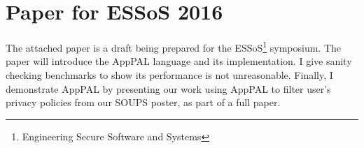 \documentclass[a4paper]{scrartcl}
\begin{document}


\newpage
\appendix

\section{Paper for ESSoS 2016}

The attached paper is a draft being prepared for the ESSoS\footnote{Engineering Secure Software and Systems} symposium.
The paper will introduce the AppPAL language and its implementation.
I give sanity checking benchmarks to show its performance is not unreasonable.
Finally, I demonstrate AppPAL by presenting our work using AppPAL to filter user's privacy policies from our SOUPS poster, as part of a full paper.


\end{document}
